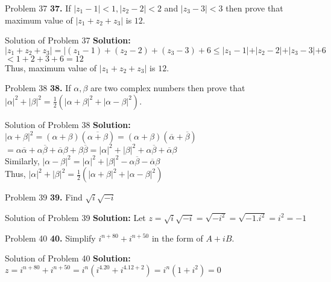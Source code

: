 \documentclass[aspectratio=169,8pt]{beamer}
\begin{document}
\begin{frame}{Problem 37}
  \textbf{37.} If $|z_1 - 1| < 1, |z_2- 2|< 2$ and $|z_3 - 3| < 3$ then prove that maximum value of $|z_1 + z_2 + z_3|$ is $12.$
\end{frame}
\begin{frame}{Solution of Problem 37}
  \textbf{Solution:} $|z_1 + z_2 + z_3| = |(z_1 - 1) + (z_2 - 2) + (z_3 - 3) + 6\leq |z_1 - 1| + |z_2 - 2| + |z_3 - 3| + 6$\\
  \vspace*{0.2cm}
  $< 1 + 2+ 3 + 6 = 12$\\
  \vspace*{0.2cm}
  Thus, maximum value of $|z_1 + z_2 + z_3|$ is $12.$
\end{frame}
\begin{frame}{Problem 38}
  \textbf{38.} If $\alpha, \beta$ are two complex numbers then prove that $|\alpha|^2 + |\beta|^2 = \frac{1}{2}(|\alpha + \beta|^2 + |\alpha - \beta|^2).$
\end{frame}
\begin{frame}{Solution of Problem 38}
  \textbf{Solution:} $|\alpha + \beta|^2 = (\alpha + \beta)(\overline{\alpha + \beta}) = (\alpha + \beta)(\overline{\alpha} + \overline{\beta})$\\
  \vspace*{0.2cm}
  $= \alpha\overline{\alpha} + \alpha\overline{\beta} + \overline{\alpha}\beta + \beta\overline{\beta} = |\alpha|^2 + |\beta|^2 + \alpha\overline{\beta} + \overline{\alpha}\beta$\\
  \vspace*{0.2cm}
  Similarly, $|\alpha - \beta|^2 = |\alpha|^2 + |\beta|^2 - \alpha\overline{\beta} - \overline{\alpha}\beta$\\
  \vspace*{0.2cm}
  Thus, $|\alpha|^2 + |\beta|^2 = \frac{1}{2}(|\alpha + \beta|^2 + |\alpha - \beta|^2)$
\end{frame}
\begin{frame}{Problem 39}
  \textbf{39.} Find $\sqrt{i}\sqrt{-i}$
\end{frame}
\begin{frame}{Solution of Problem 39}
  \textbf{Solution:} Let $z = \sqrt{i}\sqrt{-i} = \sqrt{-i^2} = \sqrt{-1.i^2} = i^2 = -1$
\end{frame}
\begin{frame}{Problem 40}
  \textbf{40.} Simplify $i^{n + 80} + i^{n + 50}$ in the form of $A + iB.$
\end{frame}
\begin{frame}{Solution of Problem 40}
  \textbf{Solution:} $z = i^{n + 80} + i^{n + 50} = i^n(i^{4.20} + i^{4.12 + 2}) = i^n(1 + i^2) = 0$
\end{frame}
\end{document}
